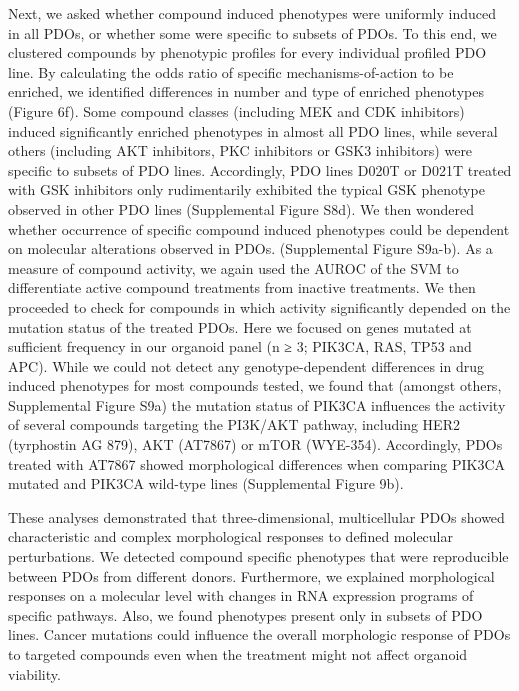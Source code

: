 Next, we asked whether compound induced phenotypes were uniformly induced in all PDOs, or whether some were specific to subsets of PDOs. To this end, we clustered compounds by phenotypic profiles for every individual profiled PDO line. By calculating the odds ratio of specific mechanisms-of-action to be enriched, we identified differences in number and type of enriched phenotypes (Figure 6f). Some compound classes (including MEK and CDK inhibitors) induced significantly enriched phenotypes in almost all PDO lines, while several others (including AKT inhibitors, PKC inhibitors or GSK3 inhibitors) were specific to subsets of PDO lines. Accordingly, PDO lines D020T or D021T treated with GSK inhibitors only rudimentarily exhibited the typical GSK phenotype observed in other PDO lines (Supplemental Figure S8d). We then wondered whether occurrence of specific compound induced phenotypes could be dependent on molecular alterations observed in PDOs. (Supplemental Figure S9a-b). As a measure of compound activity, we again used the AUROC of the SVM to differentiate active compound treatments from inactive treatments. We then proceeded to check for compounds in which activity significantly depended on the mutation status of the treated PDOs. Here we focused on genes mutated at sufficient frequency in our organoid panel (n ≥ 3; PIK3CA, RAS, TP53 and APC). While we could not detect any genotype-dependent differences in drug induced phenotypes for most compounds tested, we found that (amongst others, Supplemental Figure S9a) the mutation status of PIK3CA influences the activity of several compounds targeting the PI3K/AKT pathway, including HER2 (tyrphostin AG 879), AKT (AT7867) or mTOR (WYE-354). Accordingly, PDOs treated with AT7867 showed morphological differences when comparing PIK3CA mutated and PIK3CA wild-type lines (Supplemental Figure 9b).

These analyses demonstrated that three-dimensional, multicellular PDOs showed characteristic and complex morphological responses to defined molecular perturbations. We detected compound specific phenotypes that were reproducible between PDOs from different donors. Furthermore, we explained morphological responses on a molecular level with changes in RNA expression programs of specific pathways. Also, we found phenotypes present only in subsets of PDO lines. Cancer mutations could influence the overall morphologic response of PDOs to targeted compounds even when the treatment might not affect organoid viability.



